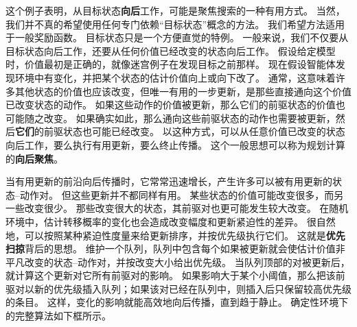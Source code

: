 \documentclass[UTF8, 12pt, fontset=fandol, oneside]{ctexart}
\begin{document}
这个例子表明，从目标状态\textbf{向后}工作，可能是聚焦搜索的一种有用方式。
当然，我们并不真的希望使用任何专门依赖“目标状态”概念的方法。
我们希望方法适用于一般奖励函数。
目标状态只是一个方便直觉的特例。
一般来说，我们不仅要从目标状态向后工作，还要从任何价值已经改变的状态向后工作。
假设给定模型时，价值最初是正确的，就像迷宫例子在发现目标之前那样。
现在假设智能体发现环境中有变化，并把某个状态的估计价值向上或向下改了。
通常，这意味着许多其他状态的价值也应该改变，但唯一有用的一步更新，是那些直接通向这个价值已改变状态的动作。
如果这些动作的价值被更新，那么它们的前驱状态的价值也可能随之改变。
如果确实如此，那么通向这些前驱状态的动作也需要被更新，然后\textbf{它们}的前驱状态也可能已经改变。
以这种方式，可以从任意价值已改变的状态向后工作，要么执行有用更新，要么终止传播。
这个一般思想可以称为规划计算的\textbf{向后聚焦}。

当有用更新的前沿向后传播时，它常常迅速增长，产生许多可以被有用更新的状态--动作对。
但这些更新并不都同样有用。
某些状态的价值可能改变很多，而另一些改变很少。
那些改变很大的状态，其前驱对也更可能发生较大改变。
在随机环境中，估计转移概率的变化也会造成改变幅度和更新紧迫性的差异。
很自然地，可以按照某种紧迫性度量来给更新排序，并按优先级执行它们。
这就是\textbf{优先扫掠}背后的思想。
维护一个队列，队列中包含每个如果被更新就会使估计价值非平凡改变的状态--动作对，并按改变大小给出优先级。
当队列顶部的对被更新后，就计算这个更新对它所有前驱对的影响。
如果影响大于某个小阈值，那么把该前驱对以新的优先级插入队列；如果该对已经在队列中，则插入后只保留较高优先级的条目。
这样，变化的影响就能高效地向后传播，直到趋于静止。
确定性环境下的完整算法如下框所示。
\end{document}
